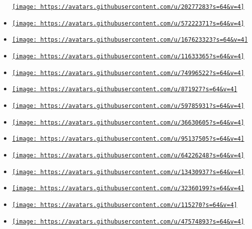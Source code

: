 \begin{itemize}
  \href{https://github.com/giannissc}{\texttt{[image: https://avatars.githubusercontent.com/u/20277283?s=64\&v=4]}}
\item
  \href{https://github.com/haenoe}{\texttt{[image: https://avatars.githubusercontent.com/u/57222371?s=64\&v=4]}}
\item
  \href{https://github.com/hardlydearly}{\texttt{[image: https://avatars.githubusercontent.com/u/167623323?s=64\&v=4]}}
\item
  \href{https://github.com/hettlage}{\texttt{[image: https://avatars.githubusercontent.com/u/11633365?s=64\&v=4]}}
\item
  \href{https://github.com/huajingyun01}{\texttt{[image: https://avatars.githubusercontent.com/u/74996522?s=64\&v=4]}}
\item
  \href{https://github.com/inferiorhumanorgans}{\texttt{[image: https://avatars.githubusercontent.com/u/871927?s=64\&v=4]}}
\item
  \href{https://github.com/jakobjpeters}{\texttt{[image: https://avatars.githubusercontent.com/u/59785931?s=64\&v=4]}}
\item
  \href{https://github.com/jiricekcz}{\texttt{[image: https://avatars.githubusercontent.com/u/36630605?s=64\&v=4]}}
\item
  \href{https://github.com/joserlopes}{\texttt{[image: https://avatars.githubusercontent.com/u/95137505?s=64\&v=4]}}
\item
  \href{https://github.com/kamack38}{\texttt{[image: https://avatars.githubusercontent.com/u/64226248?s=64\&v=4]}}
\item
  \href{https://github.com/kimushun1101}{\texttt{[image: https://avatars.githubusercontent.com/u/13430937?s=64\&v=4]}}
\item
  \href{https://github.com/kravchenkoloznia}{\texttt{[image: https://avatars.githubusercontent.com/u/32360199?s=64\&v=4]}}
\item
  \href{https://github.com/matze}{\texttt{[image: https://avatars.githubusercontent.com/u/115270?s=64\&v=4]}}
\item
  \href{https://github.com/niklasmohrin}{\texttt{[image: https://avatars.githubusercontent.com/u/47574893?s=64\&v=4]}}

\end{itemize}
